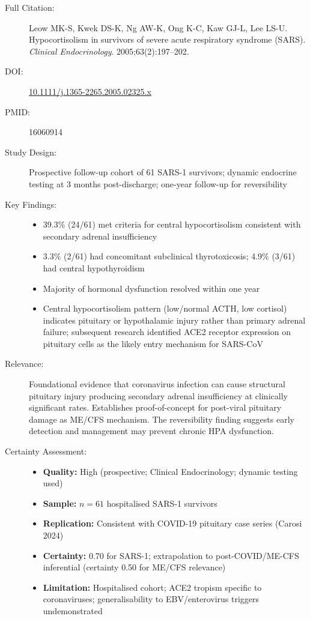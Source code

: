 \begin{description}
    \item[Full Citation:] Leow MK-S, Kwek DS-K, Ng AW-K, Ong K-C, Kaw GJ-L, Lee LS-U. Hypocortisolism in survivors of severe acute respiratory syndrome (SARS). \textit{Clinical Endocrinology}. 2005;63(2):197--202. \cite{Leow2005sars}
    \item[DOI:] \href{https://doi.org/10.1111/j.1365-2265.2005.02325.x}{10.1111/j.1365-2265.2005.02325.x}
    \item[PMID:] 16060914
    \item[Study Design:] Prospective follow-up cohort of 61 SARS-1 survivors; dynamic endocrine testing at 3 months post-discharge; one-year follow-up for reversibility
    \item[Key Findings:]
    \begin{itemize}
        \item 39.3\% (24/61) met criteria for central hypocortisolism consistent with secondary adrenal insufficiency
        \item 3.3\% (2/61) had concomitant subclinical thyrotoxicosis; 4.9\% (3/61) had central hypothyroidism
        \item Majority of hormonal dysfunction resolved within one year
        \item Central hypocortisolism pattern (low/normal ACTH, low cortisol) indicates pituitary or hypothalamic injury rather than primary adrenal failure; subsequent research identified ACE2 receptor expression on pituitary cells as the likely entry mechanism for SARS-CoV
    \end{itemize}
    \item[Relevance:] Foundational evidence that coronavirus infection can cause structural pituitary injury producing secondary adrenal insufficiency at clinically significant rates. Establishes proof-of-concept for post-viral pituitary damage as ME/CFS mechanism. The reversibility finding suggests early detection and management may prevent chronic HPA dysfunction.
    \item[Certainty Assessment:]
    \begin{itemize}
        \item \textbf{Quality:} High (prospective; Clinical Endocrinology; dynamic testing used)
        \item \textbf{Sample:} $n=61$ hospitalised SARS-1 survivors
        \item \textbf{Replication:} Consistent with COVID-19 pituitary case series (Carosi 2024)
        \item \textbf{Certainty:} 0.70 for SARS-1; extrapolation to post-COVID/ME-CFS inferential (certainty 0.50 for ME/CFS relevance)
        \item \textbf{Limitation:} Hospitalised cohort; ACE2 tropism specific to coronaviruses; generalisability to EBV/enterovirus triggers undemonstrated
    \end{itemize}
\end{description}

